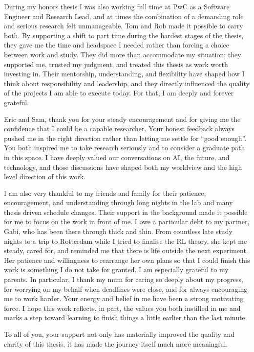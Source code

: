 During my honors thesis I was also working full time at PwC as a Software Engineer and Research Lead, and at times the combination of a demanding role and serious research felt unmanageable. Tom and Rob made it possible to carry both. By supporting a shift to part time during the hardest stages of the thesis, they gave me the time and headspace I needed rather than forcing a choice between work and study. They did more than accommodate my situation; they supported me, trusted my judgment, and treated this thesis as work worth investing in. Their mentorship, understanding, and flexibility have shaped how I think about responsibility and leadership, and they directly influenced the quality of the projects I am able to execute today. For that, I am deeply and forever grateful.

Eric and Sam, thank you for your steady encouragement and for giving me the confidence that I could be a capable researcher. Your honest feedback always pushed me in the right direction rather than letting me settle for ``good enough''. You both inspired me to take research seriously and to consider a graduate path in this space. I have deeply valued our conversations on AI, the future, and technology, and those discussions have shaped both my worldview and the high level direction of this work.

I am also very thankful to my friends and family for their patience, encouragement, and understanding through long nights in the lab and many thesis driven schedule changes. Their support in the background made it possible for me to focus on the work in front of me. I owe a particular debt to my partner, Gabi, who has been there through thick and thin. From countless late study nights to a trip to Rotterdam while I tried to finalise the RL theory, she kept me steady, cared for, and reminded me that there is life outside the next experiment. Her patience and willingness to rearrange her own plans so that I could finish this work is something I do not take for granted. I am especially grateful to my parents. In particular, I thank my mum for caring so deeply about my progress, for worrying on my behalf when deadlines were close, and for always encouraging me to work harder. Your energy and belief in me have been a strong motivating force. I hope this work reflects, in part, the values you both instilled in me and marks a step toward learning to finish things a little earlier than the last minute.

To all of you, your support not only has materially improved the quality and clarity of this thesis, it has made the journey itself much more meaningful.

\endgroup
